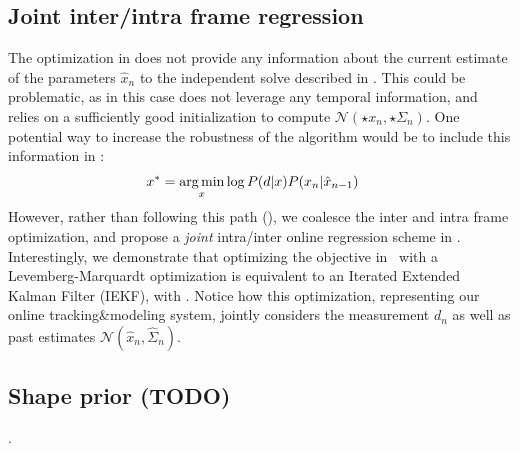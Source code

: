 
\subsection{Joint inter/intra frame regression}
The optimization in  does not provide any information about the current estimate of the parameters $\hat{x}_n$ to the independent solve described in . This could be problematic, as in this case  does not leverage any temporal information, and relies on a sufficiently good initialization to compute $\mathcal{N}(\star{x}_n, \star{\Sigma}_n)$. One potential way to increase the robustness of the algorithm would be to include this information in :
% 
\begin{align}
x^* &= \operatorname*{arg\,min}_{x} \log  P(d|x) P(x_n |\hat{x}_{n - 1}) 
\label{eq:independenttemp}
\end{align}
% 
However, rather than following this path (), we coalesce the inter and intra frame optimization, and propose a \emph{joint} intra/inter online regression scheme in . Interestingly, we demonstrate that optimizing the objective in~ with a Levemberg-Marquardt optimization is equivalent to an Iterated Extended Kalman Filter (IEKF), with .
Notice how this optimization, representing our online tracking\&modeling system, jointly considers the measurement $d_n$ as well as past estimates $\mathcal{N}(\hat{x}_n, \hat{\Sigma}_n)$.
\newpage


\subsection{Shape prior (TODO)}
\label{sec:shapeprior}
. 
